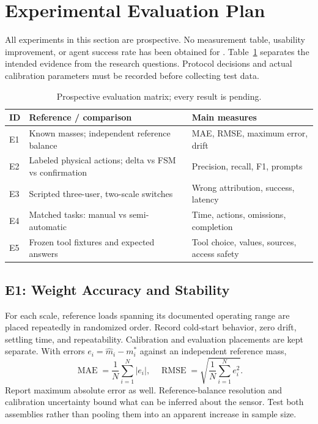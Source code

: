 \section{Experimental Evaluation Plan}\label{sec:evaluation}
All experiments in this section are prospective. No measurement table, usability improvement, or agent success rate has been obtained for \sys{}. Table~\ref{tab:eval} separates the intended evidence from the research questions. Protocol decisions and actual calibration parameters must be recorded before collecting test data.

\begin{table}[t]
\caption{Prospective evaluation matrix; every result is pending.}\label{tab:eval}
\centering\footnotesize\setlength{\tabcolsep}{4pt}
\begin{tabular}{@{}p{}p{}p{}@{}}\toprule
ID & Reference / comparison & Main measures\\\midrule
E1 & Known masses; independent reference balance & MAE, RMSE, maximum error, drift\\
E2 & Labeled physical actions; delta vs FSM vs confirmation & Precision, recall, F1, prompts\\
E3 & Scripted three-user, two-scale switches & Wrong attribution, success, latency\\
E4 & Matched tasks: manual vs semi-automatic & Time, actions, omissions, completion\\
E5 & Frozen tool fixtures and expected answers & Tool choice, values, sources, access safety\\\bottomrule
\end{tabular}
\end{table}

\subsection{E1: Weight Accuracy and Stability}
For each scale, reference loads spanning its documented operating range are placed repeatedly in randomized order. Record cold-start behavior, zero drift, settling time, and repeatability. Calibration and evaluation placements are kept separate. With errors $e_i=\hat m_i-m_i^*$ against an independent reference mass,
\begin{equation}\operatorname{MAE}=\frac{1}{N}\sum_{i=1}^N|e_i|,\quad
\operatorname{RMSE}=\sqrt{\frac{1}{N}\sum_{i=1}^Ne_i^2}.\label{eq:errors}\end{equation}
Report maximum absolute error as well. Reference-balance resolution and calibration uncertainty bound what can be inferred about the sensor. Test both assemblies rather than pooling them into an apparent increase in sample size.

